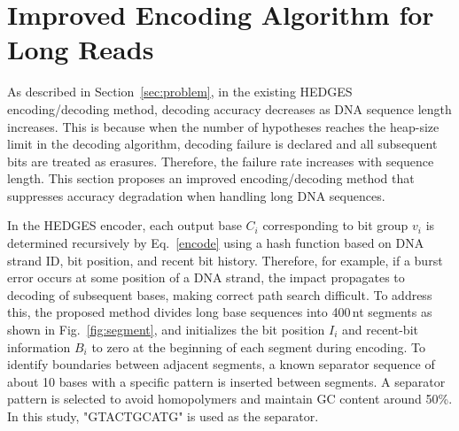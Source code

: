 \documentclass[sotsuron]{kuee}
\begin{document}
\section{Improved Encoding Algorithm for Long Reads} \label{long_read_encoding}
As described in Section~\ref{sec:problem}, in the existing HEDGES
encoding/decoding method, decoding accuracy decreases as DNA sequence length
increases.
This is because when the number of hypotheses reaches the heap-size limit in
the decoding algorithm, decoding failure is declared and all subsequent bits are
treated as erasures. Therefore, the failure rate increases with sequence
length.
This section proposes an improved encoding/decoding method that suppresses
accuracy degradation when handling long DNA sequences.

In the HEDGES encoder, each output base $C_i$ corresponding to bit group $v_i$
is determined recursively by Eq.~\eqref{encode} using a hash function based on
DNA strand ID, bit position, and recent bit history.
Therefore, for example, if a burst error occurs at some position of a DNA
strand, the impact propagates to decoding of subsequent bases, making correct
path search difficult.
To address this, the proposed method divides long base sequences into
400\,nt segments as shown in Fig.~\ref{fig:segment}, and initializes the bit
position $I_i$ and recent-bit information $B_i$ to zero at the beginning of
each segment during encoding.
To identify boundaries between adjacent segments, a known separator sequence of
about 10 bases with a specific pattern is inserted between segments.
A separator pattern is selected to avoid homopolymers and maintain GC content
around 50\%. In this study, "GTACTGCATG" is used as the separator.
\end{document}
